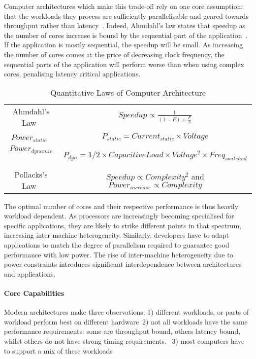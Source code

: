 Computer architectures which make this trade-off rely on one core assumption: that the workloads they process are sufficiently parallelisable and geared towards throughput rather than latency~\cite{FSSP:09}.
Indeed, Ahmdahl's law states that speedup as the number of cores increase
is bound by the sequential part of the application~\cite{4563876}. If the application  is mostly sequential, the speedup will be small. As increasing the number of  cores comes at the price of decreasing clock frequency, the sequential
parts of the application will perform worse than when using complex cores, penalising latency
critical applications. 

\begin{table*}
\begin{center}
\caption{Quantitative Laws of Computer Architecture}
\label{table:quantlaws}
\begin{tabular}{|c|c|}
Ahmdahl's Law~\cite{4563876} & $ Speedup \propto \frac{1}{(1 - P) + \frac{P}{N}} $\\ 
$Power_{static}$~\cite{hennessy2006comparchquantitative} & $P_{static} = Current_{static} \times Voltage$ \\
$Power_{dynamic}$~\cite{hennessy2006comparchquantitative} & $P_{dyn} = 1/2 \times Capacitive Load  \times Voltage^{2} \times Freq_{switched}$\\
Pollacks's Law~\cite{borkar2011future}& $ Speedup \propto Complexity^{2}$ and  $Power_{increase} \propto Complexity$\\
\end{tabular}
\end{center}

\end{table*}

The optimal number of cores and their respective 
performance is thus heavily workload dependent. As processors are increasingly becoming specialised for specific applications, they are likely to strike different points in that spectrum, 
increasing inter-machine heterogeneity. Similarly,
developers have to adapt applications to match 
the degree of parallelism required to guarantee good performance
with low power. The rise of inter-machine heterogeneity
due to power constraints introduces significant interdependence
between architectures and applications. 

\paragraph{Core Capabilities}
Modern architectures make three observations: 1) different workloads,
or parts of workload perform best on different hardware~\cite{5695539}2) not all
workloads have the same performance requirements: some are throughput
bound, others latency bound, whilst others do not have strong timing requirements.~\cite{greenhalgh2011biglittle}
3) most computers have to support a mix of these workloads~\cite{Kumar:2004:SHM:998680.1006707}

